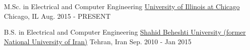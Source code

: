 
\begin{cventries}

  \cventry
    {M.Sc. in Electrical and Computer Engineering} %
    {\href{http://www.uic.edu}{University of Illinois at Chicago}} %
    {Chicago, IL} %
    {Aug. 2015 - PRESENT} %
   {
    }
\end{cventries}
\begin{cventries}

  \cventry
    {B.S. in Electrical and Computer Engineering} %
    {\href{http://en.sbu.ac.ir/}{Shahid Beheshti University (former National University of Iran)}} %
    {Tehran, Iran} %
    {Sep. 2010 - Jan 2015} %
   {
    }

\end{cventries}
